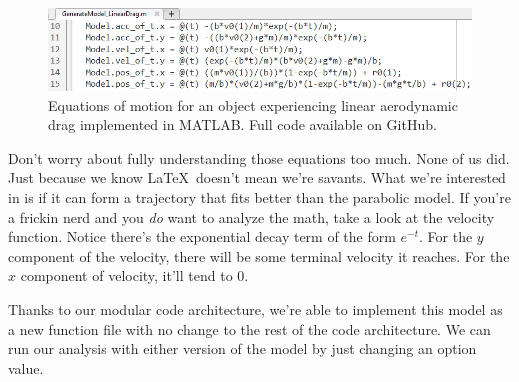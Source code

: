 \begin{figure}[t]
\centering
\includegraphics[width=\linewidth]{images/model_matlab_code_lineardrag.png}
\caption{\label{fig:model_matlab_code_lineardrag} Equations of motion for an object experiencing linear aerodynamic drag implemented in MATLAB. Full code available on GitHub.}
\end{figure}

Don't worry about fully understanding those equations too much. None of us did. Just because we know \LaTeX\ doesn't mean we're savants. What we're interested in is if it can form a trajectory that fits better than the parabolic model. If you're a frickin nerd and you \textit{do} want to analyze the math, take a look at the velocity function. Notice there's the exponential decay term of the form $e^{-t}$. For the $y$ component of the velocity, there will be some terminal velocity it reaches. For the $x$ component of velocity, it'll tend to 0. 

Thanks to our modular code architecture, we're able to implement this model as a new function file with no change to the rest of the code architecture. We can run our analysis with either version of the model by just changing an option value.
